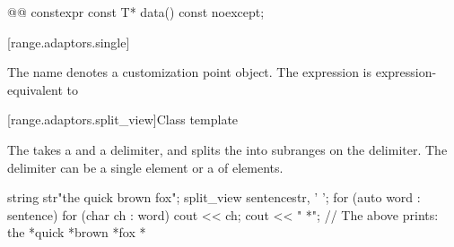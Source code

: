 %
\begin{itemdecl}
@@
constexpr const T* data() const noexcept;
\end{itemdecl}

\begin{itemdescr}
\pnum
{}

\pnum
\oldtxt{\returns}  
\end{itemdescr}

[range.adaptors.single]{}

\pnum
The name  denotes a customization point
object.  The expression
  is
expression-equivalent to  


[range.adaptors.split_view]{Class template }

\pnum
The  takes a   and a
delimiter, and splits the   into
subranges on the delimiter. The delimiter can be a single element or a
  of elements.

\pnum
\begin{example}
\begin{codeblock}
string str{"the quick brown fox"};
split_view sentence{str, ' '};
for (auto word : sentence) {
  for (char ch : word)
    cout << ch;
  cout << " *";
}
// The above prints: the *quick *brown *fox *
\end{codeblock}
\end{example}

